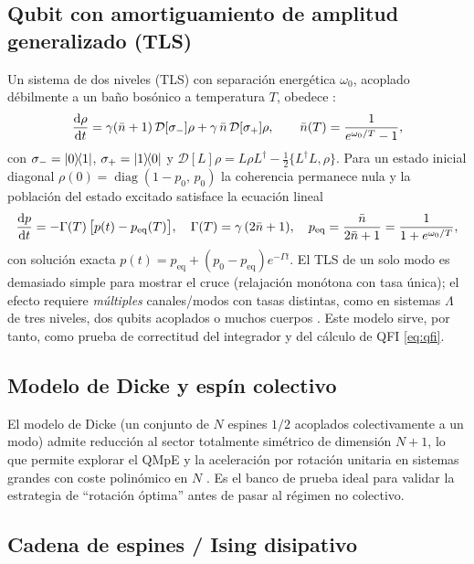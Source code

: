 \documentclass[11pt,a4paper]{article}
\theoremstyle{definition}
\theoremstyle{plain}
\newcommand{\Dop}{\mathcal{D}}
\begin{document}
\subsection{Qubit con amortiguamiento de amplitud generalizado (TLS)}

Un sistema de dos niveles (TLS) con separación energética $\omega_0$, acoplado débilmente a un baño bosónico
a temperatura $T$, obedece \cite{Chattopadhyay2026,LiYang2026}:
\begin{equation}
\dv{\rho}{t}=\gamma(\bar n+1)\,\Dop[\sigma_-]\rho+\gamma\,\bar n\,\Dop[\sigma_+]\rho,
\qquad
\bar n(T)=\frac{1}{e^{\omega_0/T}-1},
\label{eq:tls}
\end{equation}
con $\sigma_-=\dyad{0}{1}$, $\sigma_+=\dyad{1}{0}$ y $\Dop[L]\rho=L\rho L^{\dagger}-\tfrac12\{L^{\dagger}L,\rho\}$.
Para un estado inicial diagonal $\rho(0)=\operatorname{diag}(1-p_0,\,p_0)$ la coherencia permanece nula y la
población del estado excitado satisface la ecuación lineal
\begin{equation}
\dv{p}{t}=-\Gamma(T)\,\big[p(t)-p_{\mathrm{eq}}(T)\big],\quad
\Gamma(T)=\gamma\,(2\bar n+1),\quad
p_{\mathrm{eq}}=\frac{\bar n}{2\bar n+1}=\frac{1}{1+e^{\omega_0/T}},
\end{equation}
con solución exacta $p(t)=p_{\mathrm{eq}}+(p_0-p_{\mathrm{eq}})e^{-\Gamma t}$. El TLS de un solo modo es
demasiado simple para mostrar el cruce (relajación monótona con tasa única); el efecto requiere
\emph{múltiples} canales/modos con tasas distintas, como en sistemas $\Lambda$ de tres niveles, dos qubits
acoplados o muchos cuerpos \cite{LiYang2026,Chattopadhyay2026}. Este modelo sirve, por tanto, como prueba de
correctitud del integrador y del cálculo de QFI \eqref{eq:qfi}.

\subsection{Modelo de Dicke y espín colectivo}

El modelo de Dicke (un conjunto de $N$ espines $1/2$ acoplados colectivamente a un modo) admite reducción al
sector totalmente simétrico de dimensión $N+1$, lo que permite explorar el QMpE y la aceleración por
rotación unitaria en sistemas grandes con coste polinómico en $N$ \cite{Carollo2021}. Es el banco de prueba
ideal para validar la estrategia de ``rotación óptima'' antes de pasar al régimen no colectivo.

\subsection{Cadena de espines / Ising disipativo}
\end{document}
